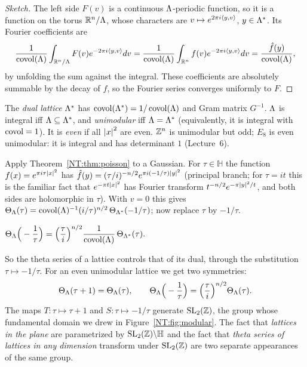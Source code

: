 \begin{proof}[Sketch]
The left side $F(v)$ is a continuous $\Lambda$-periodic function, so it is a function on the torus
$\mathbb{R}^n/\Lambda$, whose characters are $v\mapsto e^{2\pi i\langle y, v\rangle}$, $y\in\Lambda^*$. Its Fourier coefficients are
\[
  \frac{1}{\operatorname{covol}(\Lambda)}\int_{\mathbb{R}^n/\Lambda}F(v)e^{-2\pi i\langle y, v\rangle}dv
  =\frac{1}{\operatorname{covol}(\Lambda)}\int_{\mathbb{R}^n}f(v)e^{-2\pi i\langle y, v\rangle}dv=\frac{\hat f(y)}{\operatorname{covol}(\Lambda)},
\]
by unfolding the sum against the integral. These coefficients are absolutely summable by the decay of
$\hat f$, so the Fourier series converges uniformly to $F$.
\end{proof}

The \emph{dual lattice} $\Lambda^*$ has $\operatorname{covol}(\Lambda^*)=1/\operatorname{covol}(\Lambda)$ and Gram matrix $G^{-1}$. $\Lambda$ is
integral iff $\Lambda\subseteq\Lambda^*$, and \emph{unimodular} iff $\Lambda=\Lambda^*$ (equivalently, it is integral with
$\operatorname{covol}=1$). It is \emph{even} if all $\left\lvert x \right\rvert^2$ are even. $\mathbb{Z}^n$ is unimodular but odd; $E_8$ is even
unimodular: it is integral and has determinant $1$ (Lecture~6).

Apply Theorem~\ref{NT:thm:poisson} to a Gaussian. For $\tau\in\mathbb H$ the function
$f(x)=e^{\pi i\tau\left\lvert x \right\rvert^2}$ has $\hat f(y)=(\tau/i)^{-n/2}e^{\pi i(-1/\tau)\left\lvert y \right\rvert^2}$ (principal branch;
for $\tau=it$ this is the familiar fact that $e^{-\pi t\left\lvert x \right\rvert^2}$ has Fourier transform
$t^{-n/2}e^{-\pi\left\lvert y \right\rvert^2/t}$, and both sides are holomorphic in $\tau$). With $v=0$ this gives $\Theta_\Lambda(\tau)=\operatorname{covol}(\Lambda)^{-1}(i/\tau)^{n/2}\,\Theta_{\Lambda^*}(-1/\tau)$; now replace $\tau$ by $-1/\tau$.

\begin{corollary}\label{NT:cor:thetatrans}
$\displaystyle \Theta_\Lambda\Big(-\frac1\tau\Big)=\Big(\frac\tau i\Big)^{n/2}\frac{1}{\operatorname{covol}(\Lambda)}\,\Theta_{\Lambda^*}(\tau).$
\end{corollary}

So the theta series of a lattice controls that of its dual, through the substitution $\tau\mapsto-1/\tau$.
For an even unimodular lattice we get two symmetries:
\begin{equation}\label{NT:eq:modular}
  \Theta_\Lambda(\tau+1)=\Theta_\Lambda(\tau),\qquad
  \Theta_\Lambda\Big(-\frac1\tau\Big)=\Big(\frac\tau i\Big)^{n/2}\Theta_\Lambda(\tau).
\end{equation}
The maps $T\colon\tau\mapsto\tau+1$ and $S\colon\tau\mapsto-1/\tau$ generate $\mathrm{SL}_2(\mathbb{Z})$, the group
whose fundamental domain we drew in Figure~\ref{NT:fig:modular}. The fact that \emph{lattices in the
plane} are parametrized by $\mathrm{SL}_2(\mathbb{Z})\backslash\mathbb H$ and the fact that \emph{theta series of lattices
in any dimension} transform under $\mathrm{SL}_2(\mathbb{Z})$ are two separate appearances of the same group.

